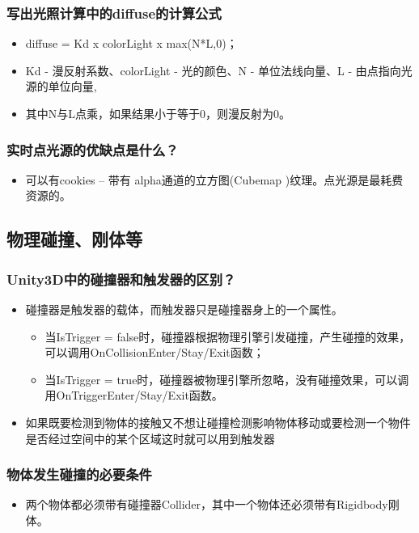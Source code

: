 \documentclass[9pt, b5paper]{article}
\begin{document}
\subsubsection{写出光照计算中的diffuse的计算公式}
\label{sec:org5e8194b}
\begin{itemize}
\item diffuse = Kd x colorLight x max(N*L,0)；
\item Kd - 漫反射系数、colorLight - 光的颜色、N - 单位法线向量、L - 由点指向光源的单位向量,
\item 其中N与L点乘，如果结果小于等于0，则漫反射为0。
\end{itemize}

\subsubsection{实时点光源的优缺点是什么？}
\label{sec:orgfa62db3}
\begin{itemize}
\item 可以有cookies – 带有 alpha通道的立方图(Cubemap )纹理。点光源是最耗费资源的。
\end{itemize}

\subsection{物理碰撞、刚体等}
\label{sec:orgaa3d132}
\subsubsection{Unity3D中的碰撞器和触发器的区别？}
\label{sec:org50cce70}
\begin{itemize}
\item 碰撞器是触发器的载体，而触发器只是碰撞器身上的一个属性。
\begin{itemize}
\item 当IsTrigger = false时，碰撞器根据物理引擎引发碰撞，产生碰撞的效果，可以调用OnCollisionEnter/Stay/Exit函数；
\item 当IsTrigger = true时，碰撞器被物理引擎所忽略，没有碰撞效果，可以调用OnTriggerEnter/Stay/Exit函数。
\end{itemize}
\item 如果既要检测到物体的接触又不想让碰撞检测影响物体移动或要检测一个物件是否经过空间中的某个区域这时就可以用到触发器
\end{itemize}
\subsubsection{物体发生碰撞的必要条件}
\label{sec:org1e08ac3}
\begin{itemize}
\item 两个物体都必须带有碰撞器Collider，其中一个物体还必须带有Rigidbody刚体。
\end{itemize}
\end{document}

